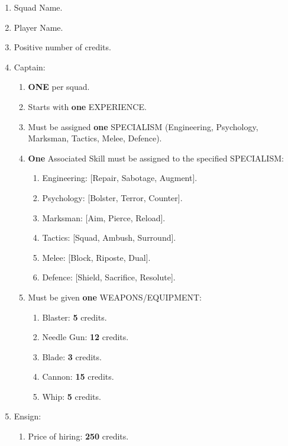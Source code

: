 \documentclass[12pt,a4paper]{article}
\begin{document}
\begin{enumerate}
 \item Squad Name.
 \item Player Name.
 \item Positive number of credits.
 \item Captain: \begin{enumerate}
                 \item \textbf{ONE} per squad.
                 \item Starts with \textbf{one} EXPERIENCE.
                 \item Must be assigned \textbf{one} SPECIALISM (Engineering, Psychology, Marksman, Tactics, Melee, Defence).
                 \item \textbf{One} Associated Skill must be assigned to the specified SPECIALISM: \begin{enumerate}
							  \item Engineering: [Repair, Sabotage, Augment].
							  \item Psychology: [Bolster, Terror, Counter].
							  \item Marksman: [Aim, Pierce, Reload].
							  \item Tactics: [Squad, Ambush, Surround].
							  \item Melee: [Block, Riposte, Dual].
							  \item Defence: [Shield, Sacrifice, Resolute].
							 \end{enumerate}
				 \item Must be given \textbf{one} WEAPONS/EQUIPMENT: \begin{enumerate}
				                                         \item Blaster: \textbf{5} credits.
				                                         \item Needle Gun: \textbf{12} credits.
				                                         \item Blade: \textbf{3} credits.
				                                         \item Cannon: \textbf{15} credits.
				                                         \item Whip: \textbf{5} credits.
				                                        \end{enumerate}
                \end{enumerate}
 \item Ensign: \begin{enumerate}
                \item Price of hiring: \textbf{250} credits.

\end{enumerate}
\end{enumerate}
\end{document}
